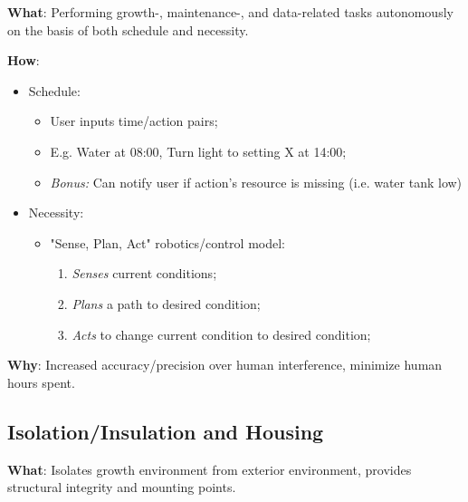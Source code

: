 \documentclass{report}
\begin{document}
\textbf{What}: Performing growth-, maintenance-, and data-related tasks autonomously on the basis of both schedule and necessity.

\textbf{How}:
\begin{itemize}
    \item Schedule:
    \begin{itemize}
        \item User inputs time/action pairs;
        \item E.g. Water at 08:00, Turn light to setting X at 14:00;
        \item \textit{Bonus:} Can notify user if action's resource is missing (i.e. water tank low)
    \end{itemize}
    \item Necessity:
    \begin{itemize}
        \item "Sense, Plan, Act" robotics/control model:
        \begin{enumerate}
            \item \textit{Senses} current conditions;
            \item \textit{Plans} a path to desired condition;
            \item \textit{Acts} to change current condition to desired condition;
        \end{enumerate}
    \end{itemize}
\end{itemize}
\textbf{Why}: Increased accuracy/precision over human interference, minimize human hours spent.

\newpage

\subsection{Isolation/Insulation and Housing}
\label{sec:isolationinsulation}

\textbf{What}: Isolates growth environment from exterior environment, provides structural integrity and mounting points.
\end{document}
